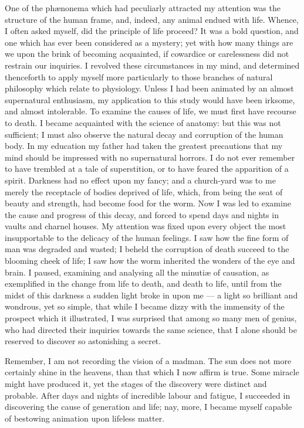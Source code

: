 One of the phænonema which had
peculiarly attrac\-ted my attention was
the structure of the human frame, and,
indeed, any animal endued with life.
Whence, I often asked myself, did the
principle of life proceed? It was a
bold question, and one which has ever
been considered as a mystery; yet with
how many things are we upon the brink
of becoming acquainted, if cowardice
or carelessness did not restrain our
inquiries. I revolved these circumstances
in my mind, and determined
thenceforth to apply myself more particularly
to those branches of natural
philosophy which relate to physiology.
Unless I had been animated
by an almost supernatural enthusiasm,
my application to this study would have
been irksome, and almost intolerable.
To examine the causes of life, we must
first have recourse to death. I became
acquainted with the science of anatomy:
but this was not sufficient; I
must also observe the natural decay and
corruption of the human body. In my
education my father had taken the
greatest precautions that my mind
should be impressed with no supernatural
horrors. I do not ever remember
to have trembled at a tale of superstition,
or to have feared the apparition
of a spirit. Darkness had no effect
upon my fancy; and a church-yard was
to me merely the receptacle of bodies
deprived of life, which, from being the
seat of beauty and strength, had become
food for the worm. Now I was led to
examine the cause and progress of this
decay, and forced to spend days and
nights in vaults and charnel houses.
My attention was fixed upon every object
the most insupportable to the delicacy
of the human feelings. I saw how
the fine form of man was degraded
and wasted; I beheld the corruption of
death succeed to the blooming cheek
of life; I saw how the worm inherited
the wonders of the eye and brain. I
paused, examining and analysing all
the minutiæ of causation, as exemplified
in the change from life to death,
and death to life, until from the midst
of this darkness a sudden light broke
in upon me --- a light so brilliant and
wondrous, yet so simple, that while I
became dizzy with the immensity of the
prospect which it illustrated, I was surprised
that among so many men of genius,
who had directed their inquiries
towards the same science, that I alone
should be reserved to discover so astonishing
a secret.

Remember, I am not recording the
vision of a madman. The sun does not
more certainly shine in the heavens,
than that which I now affirm is true.
Some miracle might have produced it,
yet the stages of the discovery were distinct
and probable. After days and
nights of incredible labour and fatigue,
I succeeded in discovering the cause of
generation and life; nay, more, I became
myself capable of bestowing animation
upon lifeless matter.

